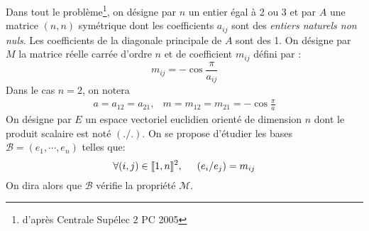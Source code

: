 Dans tout le problème\footnote{d'après Centrale Supélec 2 PC 2005}, on désigne par $n$ un entier égal à 2 ou 3 et par  $A$ une matrice $(n,n)$ symétrique dont les coefficients $a_{ij}$ sont des \emph{entiers naturels non nuls}. Les coefficients de la diagonale principale de $A$ sont des 1.\newline
On désigne par $M$ la matrice réelle carrée d'ordre $n$ et de coefficient $m_{ij}$ défini par :
\[m_{ij}=-\cos \frac{\pi}{a_{ij}}\]
Dans le cas $n=2$, on notera
\begin{eqnarray*}
 a=a_{12}=a_{21},& m=m_{12}=m_{21}=-\cos \frac{\pi}{a}
\end{eqnarray*}
On désigne par $E$ un espace vectoriel euclidien orienté de dimension $n$ dont le produit scalaire est noté $(./.)$. On se propose d'étudier les  bases $\mathcal{B}=(e_1,\cdots,e_n)$ telles que:
\begin{displaymath}
\forall (i,j)\in \llbracket 1,n \rrbracket^2,\hspace{0.5cm} (e_i/e_j)=m_{ij} 
\end{displaymath}
On dira alors que $\mathcal B$ vérifie la propriété $\mathcal M$.

